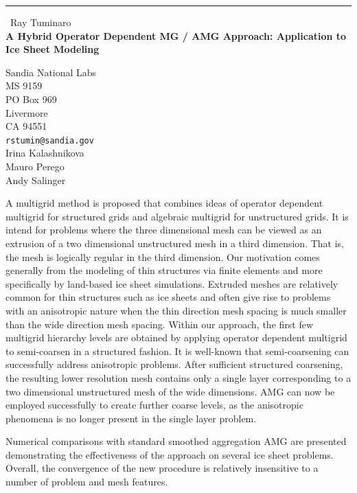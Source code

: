 \documentclass{report}
\begin{document}
\begin{center}
\rule{6in}{1pt} \
{\large Ray Tuminaro \\
{\bf A Hybrid Operator Dependent MG / AMG Approach: Application to Ice Sheet Modeling }}

Sandia National Labs \\ MS 9159 \\ PO Box 969 \\ Livermore \\ CA 94551
\\
{\tt rstumin@sandia.gov}\\
Irina Kalashnikova\\
Mauro Perego\\
Andy Salinger\end{center}

A multigrid method is proposed that combines ideas of operator dependent
multigrid for structured grids and algebraic multigrid for unstructured
grids. It is intend for problems where the three dimensional mesh can be
viewed as an extrusion of a two dimensional unstructured mesh in a third
dimension. That is, the mesh is logically regular in the third dimension.
Our motivation comes generally from the modeling of thin structures via
finite elements and more specifically by land-based ice sheet
simulations. Extruded meshes are relatively common for thin structures
such as ice sheets and often give rise to problems with an anisotropic
nature when the thin direction mesh spacing is much smaller than the wide
direction mesh spacing. Within our approach, the first few multigrid
hierarchy levels are obtained by applying operator dependent multigrid to
semi-coarsen in a structured fashion. It is well-known that
semi-coarsening can successfully address anisotropic problems. After
sufficient structured coarsening, the resulting lower resolution mesh
contains only a single layer corresponding to a two dimensional
unstructured mesh of the wide dimensions. AMG can now be employed
successfully to create further coarse levels, as the anisotropic
phenomena is no longer present in the single layer problem.

Numerical comparisons with standard smoothed aggregation AMG are
presented demonstrating the effectiveness of the approach on several ice
sheet problems. Overall, the convergence of the new procedure is
relatively insensitive to a number of problem and mesh features.
\end{document}
